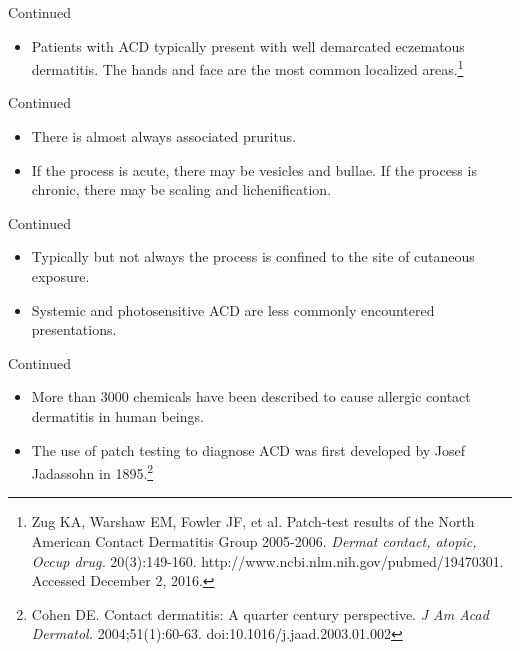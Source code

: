 \documentclass[11pt]{beamer}
\begin{document}
\begin{frame}{Continued}
\begin{itemize}
\item Patients with ACD typically present with well demarcated eczematous dermatitis. The hands and face are the most common localized areas.\footnote{Zug KA, Warshaw EM, Fowler JF, et al. Patch-test results of the North American Contact Dermatitis Group 2005-2006. \textit{Dermat  contact, atopic, Occup drug.} 20(3):149-160. http://www.ncbi.nlm.nih.gov/pubmed/19470301. Accessed December 2, 2016.
}
\end{itemize}
\end{frame}


\begin{frame}{Continued}
\begin{itemize}
\item There is almost always associated pruritus. 
\item If the process is acute, there may be vesicles and bullae. If the process is chronic, there may be scaling and lichenification.\footnotemark
\end{itemize}

\end{frame}

\begin{frame}{Continued}
\begin{itemize}
\item Typically but not always the process is confined to the site of cutaneous exposure.
\item Systemic and photosensitive ACD are less commonly encountered presentations.\footnotemark[3]
\end{itemize}
\end{frame}

\begin{frame}{Continued}
\begin{itemize}
\item More than 3000 chemicals have been described to cause allergic contact dermatitis in human beings.
\item The use of patch testing to diagnose ACD was first developed by Josef Jadassohn in 1895.\footnote{Cohen DE. Contact dermatitis: A quarter century perspective. \textit{J Am Acad Dermatol.} 2004;51(1):60-63. doi:10.1016/j.jaad.2003.01.002}
\end{itemize}
\end{frame}
\end{document}
